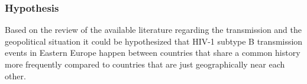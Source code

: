     \subsubsection{Hypothesis}

    Based on the review of the available literature regarding the transmission and the geopolitical situation it could be hypothesized that HIV-1 subtype B transmission events in Eastern Europe happen between countries that share a common history more frequently compared to countries that are just geographically near each other. 